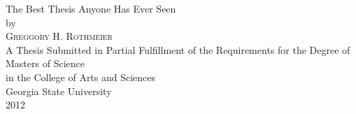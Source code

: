 \thispagestyle{empty}
\begin{titlepage}
\begin{center}
\vspace*{\fill}
{ \huge The Best Thesis Anyone Has Ever Seen } \\
\vspace{1.0in}
by \\
\vspace{1.0in}
{ \large \textsc{Greggory H. Rothmeier} } \\
\vspace{2.0in}
A Thesis Submitted in Partial Fulfillment of the Requirements for the Degree of\\
Masters of Science\\
in the College of Arts and Sciences\\
Georgia State University\\
2012\\
\vspace*{\fill}
\end{center}
\end{titlepage}
